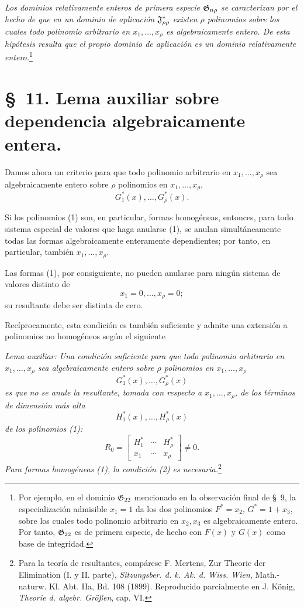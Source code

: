 \documentclass[11pt]{article}
\begin{document}
\emph{Los dominios relativamente enteros de primera especie $\mathfrak{G}_{n\rho}$ se caracterizan por el hecho de que en un dominio de aplicación $\mathfrak{J}^*_{\rho\rho}$ existen $\rho$ polinomios sobre los cuales todo polinomio arbitrario en $x_1,\ldots,x_\rho$ es algebraicamente entero. De esta hipótesis resulta que el propio dominio de aplicación es un dominio relativamente entero.}\footnote{Por ejemplo, en el dominio $\mathfrak{G}_{22}$ mencionado en la observación final de \S\ 9, la especialización admisible $x_1=1$ da los dos polinomios $F^*=x_2$, $G^*=1+x_3$, sobre los cuales todo polinomio arbitrario en $x_2,x_3$ es algebraicamente entero. Por tanto, $\mathfrak{G}_{22}$ es de primera especie, de hecho con $F(x)$ y $G(x)$ como base de integridad.}

\section*{\S\ 11. Lema auxiliar sobre dependencia algebraicamente entera.}

Damos ahora un criterio para que todo polinomio arbitrario en $x_1,\ldots,x_\rho$ sea algebraicamente entero sobre $\rho$ polinomios en $x_1,\ldots,x_\rho$,
\begin{equation}
  G_1^*(x),\ldots,G_\rho^*(x).
\tag{1}
\end{equation}

Si los polinomios (1) son, en particular, formas homogéneas, entonces, para todo sistema especial de valores que haga anularse (1), se anulan simultáneamente todas las formas algebraicamente enteramente dependientes; por tanto, en particular, también $x_1,\ldots,x_\rho$.

Las formas (1), por consiguiente, no pueden anularse para ningún sistema de valores distinto de
\[
  x_1=0,
  \ldots,
  x_\rho=0;
\]
su resultante debe ser distinta de cero.

Recíprocamente, esta condición es también suficiente y admite una extensión a polinomios no homogéneos según el siguiente

\emph{Lema auxiliar: Una condición suficiente para que todo polinomio arbitrario en $x_1,\ldots,x_\rho$ sea algebraicamente entero sobre $\rho$ polinomios en $x_1,\ldots,x_\rho$}
\[
  G_1^*(x),\ldots,G_\rho^*(x)
\]
\emph{es que no se anule la resultante, tomada con respecto a $x_1,\ldots,x_\rho$, de los términos de dimensión más alta}
\[
  H_1^*(x),\ldots,H_\rho^*(x)
\]
\emph{de los polinomios (1):}
\begin{equation}
  R_0=\left[
  \begin{array}{ccc}
    H_1^*&\cdots&H_\rho^*\\
    x_1&\cdots&x_\rho
  \end{array}
  \right]\ne0.
\tag{2}
\end{equation}
\emph{Para formas homogéneas (1), la condición (2) es necesaria.}\footnote{Para la teoría de resultantes, compárese F. Mertens, Zur Theorie der Elimination (I. y II. parte), \emph{Sitzungsber. d. k. Ak. d. Wiss. Wien}, Math.-naturw. Kl. Abt. IIa, Bd. 108 (1899). Reproducido parcialmente en J. König, \emph{Theorie d. algebr. Größen}, cap. VI.}
\end{document}
